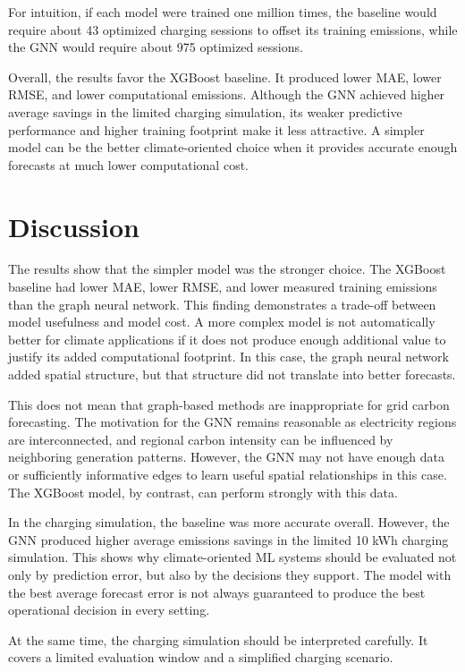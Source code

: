 \documentclass{article}
\begin{document}
For intuition, if each model were trained one million times, the baseline would require about 43 optimized charging sessions to offset its training emissions, while the GNN would require about 975 optimized sessions. 

Overall, the results favor the XGBoost baseline. It produced lower MAE, lower RMSE, and lower computational emissions. Although the GNN achieved higher average savings in the limited charging simulation, its weaker predictive performance and higher training footprint make it less attractive. A simpler model can be the better climate-oriented choice when it provides accurate enough forecasts at much lower computational cost.

\section{Discussion}

The results show that the simpler model was the stronger choice. The XGBoost baseline had lower MAE, lower RMSE, and lower measured training emissions than the graph neural network. This finding demonstrates a trade-off between model usefulness and model cost. A more complex model is not automatically better for climate applications if it does not produce enough additional value to justify its added computational footprint. In this case, the graph neural network added spatial structure, but that structure did not translate into better forecasts.

This does not mean that graph-based methods are inappropriate for grid carbon forecasting. The motivation for the GNN remains reasonable as electricity regions are interconnected, and regional carbon intensity can be influenced by neighboring generation patterns. However, the GNN may not have enough data or sufficiently informative edges to learn useful spatial relationships in this case. The XGBoost model, by contrast, can perform strongly with this data.

In the charging simulation, the baseline was more accurate overall. However, the GNN produced higher average emissions savings in the limited 10 kWh charging simulation. This shows why climate-oriented ML systems should be evaluated not only by prediction error, but also by the decisions they support. The model with the best average forecast error is not always guaranteed to produce the best operational decision in every setting.

At the same time, the charging simulation should be interpreted carefully. It covers a limited evaluation window and a simplified charging scenario.
\end{document}
